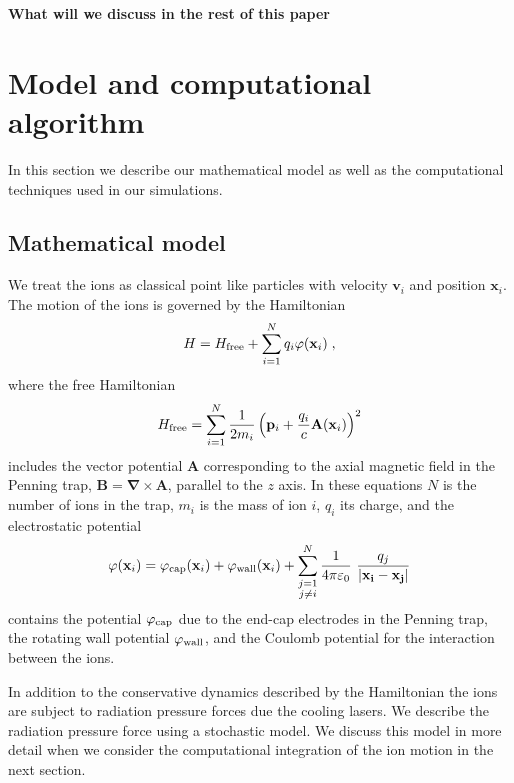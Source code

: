 \documentclass[aps, pra, preprint]{revtex4-1}
\newcommand{\hfree}{H_{\rm free}}
\newcommand{\phicap}{\varphi_{\rm cap}}
\newcommand{\phiwall}{\varphi_{\rm wall}}
\begin{document}
{\bf What will we discuss in the rest of this paper}


\section{Model and computational algorithm}

In this section we describe our mathematical model as well as the
computational techniques used in our simulations.


\subsection{Mathematical model}

We treat the ions as classical point like particles with 
velocity $\mathbf{v}_i$ and position $\mathbf{x}_i$. The motion
of the ions is governed by the Hamiltonian
\begin{equation}
  H = \hfree + \sum_{i=1}^N q_i\varphi(\mathbf{x}_i)\;,
\end{equation}
where the free Hamiltonian
\begin{equation}
  \hfree =
  \sum_{i=1}^N \frac{1}{2m_i}\left(
    \mathbf{p}_i +
    \frac{q_i}{c}\mathbf{A}(\mathbf{x}_i) \right)^2 
\end{equation}
includes the vector potential $\mathbf{A}$ corresponding to the
axial magnetic field in the Penning trap, $\mathbf{B} =
\mathbf{\nabla}\times \mathbf{A}$, parallel to the $z$ axis. In
these equations $N$ is the number of ions in the trap, $m_i$ is
the mass of ion $i$, $q_i$ its charge, and the electrostatic
potential
\begin{equation}
  \varphi(\mathbf{x}_i) =
  \phicap(\mathbf{x}_i) +
  \phiwall(\mathbf{x}_i) +
  \sum_{\substack{j=1\\j\neq i}}^N
  \frac{1}{4\pi\varepsilon_0}\
  \frac{q_j}{\left| \mathbf{x_i} - \mathbf{x_j} \right|}
\end{equation}
contains the potential $\phicap$\todo{Need discussion of
$\phicap$} due to the end-cap electrodes in the Penning trap,
the rotating wall potential $\phiwall$, and the Coulomb potential
for the interaction between the ions.

In addition to the conservative dynamics described by the
Hamiltonian the ions are subject to radiation pressure forces due
the cooling lasers. We describe the radiation pressure force
using a stochastic model. We discuss this model in more detail
when we consider the computational integration of the ion motion
in the next section.
\end{document}
